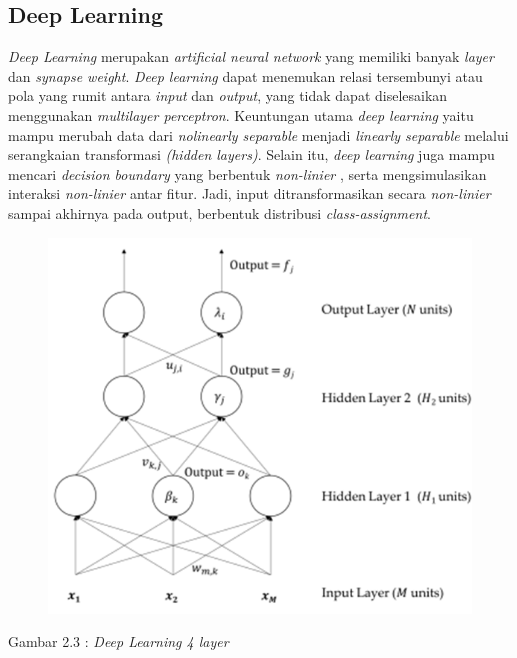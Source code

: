 \subsection{Deep Learning}
\textit{Deep Learning} merupakan \textit{artificial neural network} yang memiliki banyak \textit{layer} dan \textit{synapse weight}. 
\textit{Deep learning} dapat menemukan relasi tersembunyi atau pola yang rumit antara \textit{input} dan \textit{output}, yang 
 tidak dapat diselesaikan menggunakan \textit{multilayer perceptron}. Keuntungan  utama  \textit{deep  learning}  yaitu 
 mampu merubah data dari \textit{nolinearly separable} menjadi \textit{linearly separable} melalui serangkaian transformasi 
 \textit{(hidden layers)}. Selain itu, \textit{deep learning} juga mampu mencari \textit{decision boundary} yang berbentuk \textit{non-linier}
 , serta mengsimulasikan interaksi \textit{non-linier} antar fitur. Jadi, input ditransformasikan secara 
 \textit{non-linier} sampai akhirnya pada output, berbentuk distribusi \textit{class-assignment}\citep{DeepLearning}.

 \begin{figure} [H] \centering
    \includegraphics[scale=0.6]{gambar/deeplearning.png}
    \label{fig:Deep Learning}
\end{figure}

\begin{center}
    Gambar 2.3 : \textit{Deep Learning 4 layer}
\end{center}

